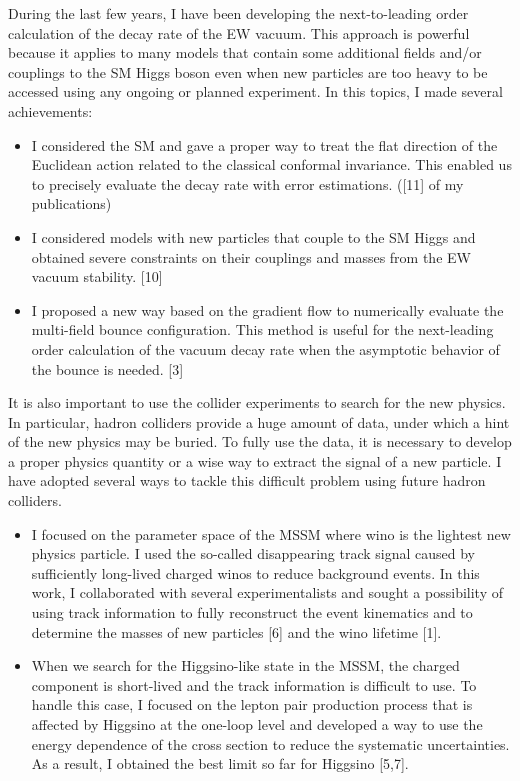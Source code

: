 \documentclass[12pt,notitlepage]{article}
\begin{document}
During the last few years, I have been developing the next-to-leading order calculation of the decay rate of the EW vacuum.
This approach is powerful because it applies to many models that contain some additional fields and/or couplings to the SM Higgs boson even when new particles are too heavy to be accessed using any ongoing or planned experiment.
In this topics, I made several achievements:
\vspace{-1.3mm}
\begin{itemize}
  \setlength{\parskip}{0mm}
  \setlength{\itemsep}{1mm}
  \item
    I considered the SM and gave a proper way to treat the flat direction of the Euclidean action related to the classical conformal invariance.
    This enabled us to precisely evaluate the decay rate with error estimations. ([11] of my publications)
  \item
    I considered models with new particles that couple to the SM Higgs and obtained severe constraints on their couplings and masses from the EW vacuum stability. [10]
  \item
    I proposed a new way based on the gradient flow to numerically evaluate the multi-field bounce configuration.
    This method is useful for the next-leading order calculation of the vacuum decay rate when the asymptotic behavior of the bounce is needed. [3]
\end{itemize}

It is also important to use the collider experiments to search for the new physics.
In particular, hadron colliders provide a huge amount of data, under which a hint of the new physics may be buried.
To fully use the data, it is necessary to develop a proper physics quantity or a wise way to extract the signal of a new particle.
I have adopted several ways to tackle this difficult problem using future hadron colliders.
\vspace{-1.3mm}
\begin{itemize}
  \setlength{\parskip}{0mm}
  \setlength{\itemsep}{1mm}
  \item
    I focused on the parameter space of the MSSM where wino is the lightest new physics particle.
    I used the so-called disappearing track signal caused by sufficiently long-lived charged winos to reduce background events.
    In this work, I collaborated with several experimentalists and sought a possibility of using track information to fully reconstruct the event kinematics and to determine the masses of new particles [6] and the wino lifetime [1].
  \item
    When we search for the Higgsino-like state in the MSSM, the charged component is short-lived and the track information is difficult to use.
    To handle this case, I focused on the lepton pair production process that is affected by Higgsino at the one-loop level and developed a way to use the energy dependence of the cross section to reduce the systematic uncertainties.
    As a result, I obtained the best limit so far for Higgsino [5,7].
\end{itemize}
\end{document}
